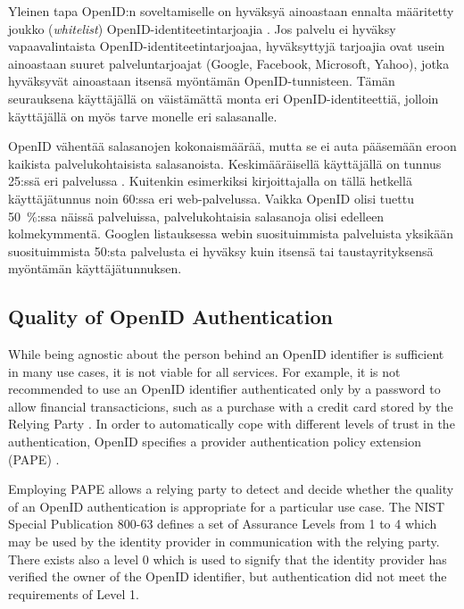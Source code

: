 \documentclass[english,gradu]{tktltiki}
\begin{document}
Yleinen tapa OpenID:n soveltamiselle on hyväksyä ainoastaan ennalta määritetty joukko (\emph{whitelist})
OpenID-identiteetintarjoajia \cite{openid_seven_sites_mailinglist, openid_tech_or_movement}. Jos palvelu ei
hyväksy vapaavalintaista OpenID-identiteetintarjoajaa, hyväksyttyjä tarjoajia ovat usein ainoastaan suuret
palveluntarjoajat (Google, Facebook, Microsoft, Yahoo), jotka hyväksyvät ainoastaan itsensä myöntämän
OpenID-tunnisteen. Tämän seurauksena käyttäjällä on väistämättä monta eri OpenID-identiteettiä, jolloin
käyttäjällä on myös tarve monelle eri salasanalle.

OpenID vähentää salasanojen kokonaismäärää, mutta se ei auta pääsemään eroon kaikista palvelukohtaisista
salasanoista. Keskimääräisellä käyttäjällä on tunnus 25:ssä eri palvelussa \cite{study_of_passwords_07}.
Kuitenkin esimerkiksi kirjoittajalla on tällä hetkellä käyttäjätunnus noin 60:ssa eri web-palvelussa. Vaikka
OpenID olisi tuettu 50~\%:ssa näissä palveluissa, palvelukohtaisia salasanoja olisi edelleen kolmekymmentä.
Googlen listauksessa webin suosituimmista palveluista \cite{google_top1000_sites} yksikään suosituimmista
50:sta palvelusta ei hyväksy kuin itsensä tai taustayrityksensä myöntämän käyttäjätunnuksen.


\subsection{Quality of OpenID Authentication}


   While being agnostic about the person behind an OpenID identifier is sufficient in many use cases, it is not viable for all services. For example, it is not recommended to use an OpenID identifier authenticated only by a password to allow financial transacticions, such as a purchase with a credit card stored by the Relying Party \cite{yahoo_openid_bestpractices_2010}. In order to automatically cope with different levels of trust in the authentication, OpenID specifies a provider authentication policy extension (PAPE) \cite{openid_2.0_specification_07, openid_2.0_pape_07}.

   Employing PAPE allows a relying party to detect and decide whether the quality of an OpenID authentication is appropriate for a particular use case. The NIST Special Publication 800-63 \cite{NIST_SP800-63} defines a set of Assurance Levels from 1 to 4 which may be used by the identity provider in communication with the relying party. There exists also a level 0 which is used to signify that the identity provider has verified the owner of the OpenID identifier, but authentication did not meet the requirements of Level 1.
\end{document}
